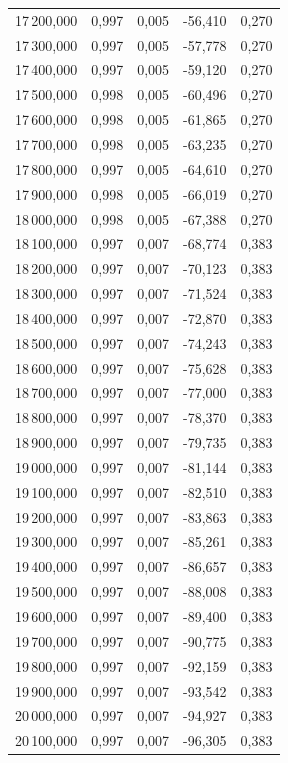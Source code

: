 \begin{longtable}{rrrrr}
17\,200,000 & 0,997 & 0,005 & -56,410 & 0,270\\
17\,300,000 & 0,997 & 0,005 & -57,778 & 0,270\\
17\,400,000 & 0,997 & 0,005 & -59,120 & 0,270\\
17\,500,000 & 0,998 & 0,005 & -60,496 & 0,270\\
17\,600,000 & 0,998 & 0,005 & -61,865 & 0,270\\
17\,700,000 & 0,998 & 0,005 & -63,235 & 0,270\\
17\,800,000 & 0,997 & 0,005 & -64,610 & 0,270\\
17\,900,000 & 0,998 & 0,005 & -66,019 & 0,270\\
18\,000,000 & 0,998 & 0,005 & -67,388 & 0,270\\
18\,100,000 & 0,997 & 0,007 & -68,774 & 0,383\\
18\,200,000 & 0,997 & 0,007 & -70,123 & 0,383\\
18\,300,000 & 0,997 & 0,007 & -71,524 & 0,383\\
18\,400,000 & 0,997 & 0,007 & -72,870 & 0,383\\
18\,500,000 & 0,997 & 0,007 & -74,243 & 0,383\\
18\,600,000 & 0,997 & 0,007 & -75,628 & 0,383\\
18\,700,000 & 0,997 & 0,007 & -77,000 & 0,383\\
18\,800,000 & 0,997 & 0,007 & -78,370 & 0,383\\
18\,900,000 & 0,997 & 0,007 & -79,735 & 0,383\\
19\,000,000 & 0,997 & 0,007 & -81,144 & 0,383\\
19\,100,000 & 0,997 & 0,007 & -82,510 & 0,383\\
19\,200,000 & 0,997 & 0,007 & -83,863 & 0,383\\
19\,300,000 & 0,997 & 0,007 & -85,261 & 0,383\\
19\,400,000 & 0,997 & 0,007 & -86,657 & 0,383\\
19\,500,000 & 0,997 & 0,007 & -88,008 & 0,383\\
19\,600,000 & 0,997 & 0,007 & -89,400 & 0,383\\
19\,700,000 & 0,997 & 0,007 & -90,775 & 0,383\\
19\,800,000 & 0,997 & 0,007 & -92,159 & 0,383\\
19\,900,000 & 0,997 & 0,007 & -93,542 & 0,383\\
20\,000,000 & 0,997 & 0,007 & -94,927 & 0,383\\
20\,100,000 & 0,997 & 0,007 & -96,305 & 0,383\\

\end{longtable}

